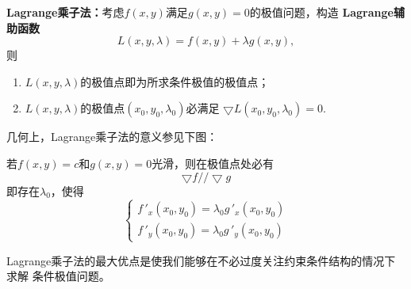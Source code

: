 \begin{thx}
	{\bf Lagrange乘子法：}考虑$f(x,y)$满足$g(x,y)=0$的极值问题，构造
	{\bf Lagrange辅助函数}
	$${L(x,y,\lambda)=f(x,y)+\lambda g(x,y)},$$
	则
	\begin{enumerate}%
	  \item $L(x,y,\lambda)$的极值点即为所求条件极值的极值点； 
	  \item $L(x,y,\lambda)$的极值点$(x_0,y_0,\lambda_0)$必满足 
	  $\bigtriangledown L(x_0,y_0,\lambda_0)=0.$
	\end{enumerate}
\end{thx}

几何上，Lagrange乘子法的意义参见下图：
\begin{center}
\end{center}
若$f(x,y)=c$和$g(x,y)=0$光滑，则在极值点处必有
$${\bigtriangledown f // \bigtriangledown g}$$
即存在$\lambda_0$，使得
$$
{\left\{\begin{array}{l}
	f\,'_x(x_0,y_0)=\lambda_0g\,'_x(x_0,y_0)\\
	f\,'_y(x_0,y_0)=\lambda_0g\,'_y(x_0,y_0)
\end{array}
\right.}$$

Lagrange乘子法的最大优点是使我们能够在不必过度关注约束条件结构的情况下求解
条件极值问题。

